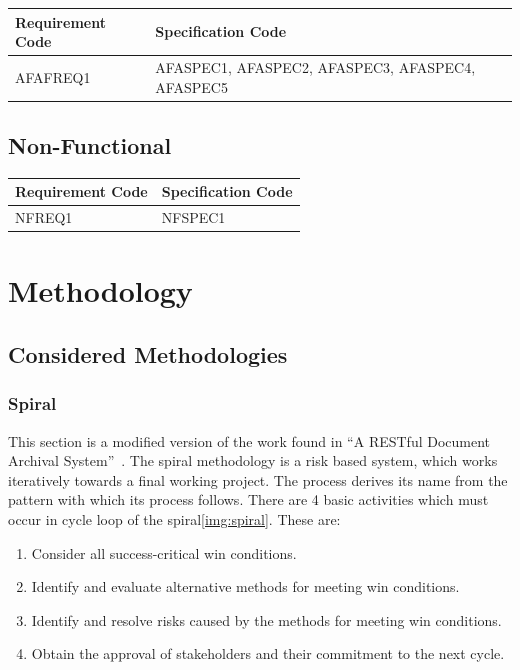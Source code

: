 \documentclass[11pt,a4paper]{article}
\begin{document}
\begin{longtable}{|p{2.7cm}|p{10cm}|}
\hline
\textbf{Requirement Code} & \textbf{Specification Code} \\

\hline \hline AFAFREQ1 & AFASPEC1, AFASPEC2, AFASPEC3, AFASPEC4, AFASPEC5  \\
\hline 
\end{longtable}


\subsection{Non-Functional}

\begin{longtable}{|p{2.7cm}|p{10cm}|}
\hline
\textbf{Requirement Code} & \textbf{Specification Code} \\

\hline \hline NFREQ1 & NFSPEC1\\
\hline 
\end{longtable}

\section{Methodology}
\label{sec:methodologies}

\subsection{Considered Methodologies}

\subsubsection{Spiral}
This section is a modified version of the work found in ``A RESTful Document Archival System''~\cite{restWeb}. The spiral methodology is a risk based system, which works iteratively towards a final working project. The process derives its name from the pattern with which its process follows. There are 4 basic activities which must occur in cycle loop of the spiral\ref{img:spiral}. These are:

\begin{enumerate}
  \item Consider all success-critical win conditions.
  \item Identify and evaluate alternative methods for meeting win conditions.
  \item Identify and resolve risks caused by the methods for meeting win conditions. 
  \item Obtain the approval of stakeholders and their commitment to the next cycle. 
\end{enumerate}
\end{document}
